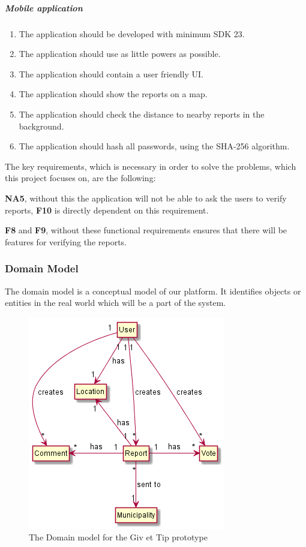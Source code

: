 \subparagraph{Mobile application}
\begin{enumerate}[label=NA\arabic*]
\item The application should be developed with minimum SDK 23.
\item The application should use as little powers as possible.
\item The application should contain a user friendly UI.
\item The application should show the reports on a map.
\item The application should check the distance to nearby reports in the background.
\item The application should hash all passwords, using the SHA-256 algorithm.
\end{enumerate}


The key requirements, which is necessary in order to solve the problems, which this project focuses on, are the following:

\textbf{NA5}, without this the application will not be able to ask the users to verify reports, \textbf{F10} is directly dependent on this requirement.

\textbf{F8} and \textbf{F9}, without these functional requirements ensures that there will be features for verifying the reports.


\subsubsection{Domain Model}
The domain model is a conceptual model of our platform. It identifies objects or entities in the real world which will be a part of the system.

\begin{figure}[hbt]
\centering
\includegraphics[width=.6\textwidth]{images/domain_diagram}
\caption{The Domain model for the Giv et Tip prototype} \label{fig:dom_diag}
\end{figure}



